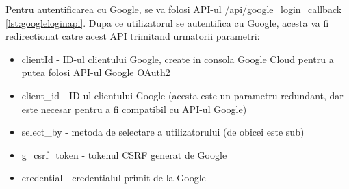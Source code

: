 \documentclass[titlepage,12pt]{article}
\DeclareRobustCommand{\code}[1]{{\ttfamily\small #1}}
\begin{document}
Pentru autentificarea cu Google, se va folosi API-ul \code{/api/google\_login\_callback} \cref{lst:googleloginapi}. Dupa ce utilizatorul se autentifica cu Google, acesta va fi redirectionat catre acest API trimitand urmatorii parametri:
\begin{itemize}
\item \code{clientId} - ID-ul clientului Google, create in consola Google Cloud pentru a putea folosi API-ul Google OAuth2
\item \code{client\_id} - ID-ul clientului Google (acesta este un parametru redundant, dar este necesar pentru a fi compatibil cu API-ul Google)
\item \code{select\_by} - metoda de selectare a utilizatorului (de obicei este \code{sub})
\item \code{g\_csrf\_token} - tokenul CSRF generat de Google
\item \code{credential} - credentialul primit de la Google
\end{itemize}
\end{document}

